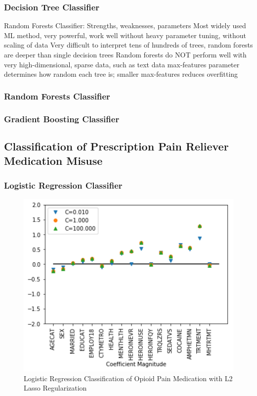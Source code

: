 \documentclass[sigconf]{acmart}
\begin{document}
\cite{raschka17}

\subsubsection{Decision Tree Classifier\cite{muller17}}

Random Forests Classifier: Strengths, weaknesses, parameters
Most widely used ML method, very powerful, work well without heavy parameter tuning, without scaling of data
Very difficult to interpret tens of hundreds of trees, random forests are deeper than single decision trees
Random forests do NOT perform well with very high-dimensional, sparse data, such as text data
max-features parameter determines how random each tree is; smaller max-features reduces overfitting


\subsubsection{Random Forests Classifier\cite{muller17}}

\subsubsection{Gradient Boosting Classifier\cite{muller17}}



\subsection{Classification of Prescription Pain Reliever Medication Misuse}

\subsubsection{Logistic Regression Classifier\cite{muller17}}

\begin{figure}[!ht]
  \centering\includegraphics[width=\columnwidth]{images/Figure4.pdf}
  \caption{Logistic Regression Classification of Opioid Pain Medication
  with L2 Lasso Regularization}
  \label{f:Figure4}
\end{figure}
\end{document}
